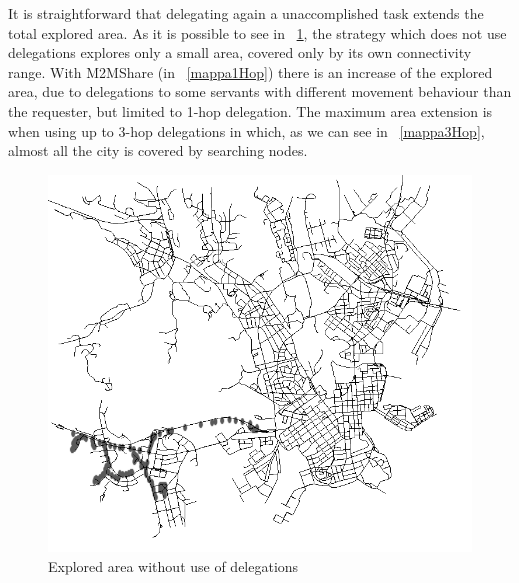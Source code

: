 It is straightforward that delegating again a unaccomplished task extends the total explored area. As it is possible to see in \figurename~\ref{mappa0Hop}, the strategy which does not use delegations explores only a small area, covered only by its own connectivity range. With M2MShare (in \figurename~\ref{mappa1Hop}) there is an increase of the explored area, due to delegations to some servants with different movement behaviour than the requester, but limited to 1-hop delegation. The maximum area extension is when using up to 3-hop delegations in which, as we can see in \figurename~\ref{mappa3Hop}, almost all the city is covered by searching nodes.

\begin{figure}[htpb]
  \begin{center}
    \includegraphics[scale=0.35]{figure/mappa_0_hop.png}
    \caption{Explored area without use of delegations}
    \label{mappa0Hop}
  \end{center}
\end{figure}

